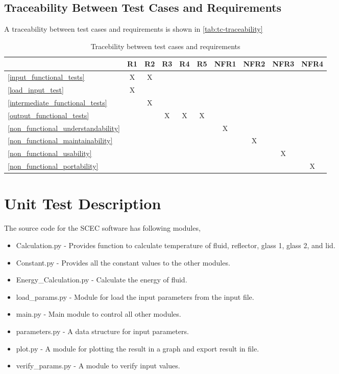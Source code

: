 \documentclass[12pt, titlepage]{article}
\begin{document}
\subsection{Traceability Between Test Cases and Requirements}

A traceability between test cases and requirements is shown in \autoref{tab:tc-traceability} 



\begin{table}[h!]
\begin{center}
\begin{tabular}{ l|c|c|c|c|c|c|c|c|c }
\hline
 & R1   & R2 & R3 & R4 & R5 & NFR1 & NFR2 & NFR3 & NFR4 \\
\hline
\ref{input_functional_tests} & X & X & & & & & & \\
\hline
\ref{load_input_test} & X & & & & & & & \\
\hline
\ref{intermediate_functional_tests} & & X & & & & & & \\
\hline
\ref{output_functional_tests} &  &  & X & X & X & & & \\
\hline
\ref{non_functional_understandability} & & & & & & X & & & \\
\hline
\ref{non_functional_maintainability} & & & & & & & X & & \\
\hline
\ref{non_functional_usability} & & & & & & & & X & \\
\hline
\ref{non_functional_portability} & & & & & & & & & X \\

\hline
\end{tabular}
\caption{Tracebility between test cases and requirements}
\label{tab:tc-traceability}
\end{center}
\end{table}

\section{Unit Test Description}
The source code for the SCEC software has following modules, 
\begin{itemize}
    \item Calculation.py - Provides function to calculate temperature of fluid, reflector, glass 1, glass 2, and lid. 
    \item Constant.py - Provides all the constant values to the other modules. 
    \item Energy\_Calculation.py - Calculate the energy of fluid. 
    \item load\_params.py - Module for load the input parameters from the input file. 
    \item main.py - Main module to control all other modules.
    \item parameters.py - A data structure for input parameters.
    \item plot.py - A module for plotting the result in a graph and export result in file. 
    \item verify\_params.py - A module to verify input values.
    
\end{itemize}
\end{document}
